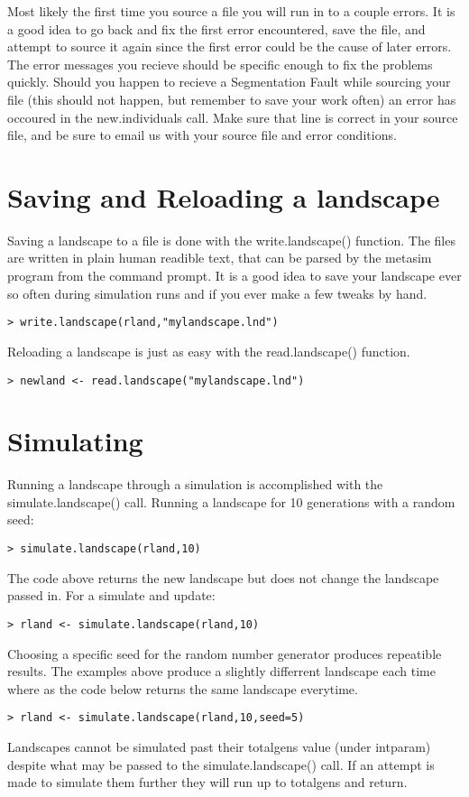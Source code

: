 \documentclass{article}
\begin{document}
Most likely the first time you source a file you will run in to a couple errors.  It is a good idea to go back and fix the first error encountered, save the file, and attempt to source it again since the first error could be the cause of later errors.  The error messages you recieve should be specific enough to fix the problems quickly.  Should you happen to recieve a Segmentation Fault while sourcing your file (this should not happen, but remember to save your work often) an error has occoured in the new.individuals call.  Make sure that line is correct in your source file, and be sure to email us with your source file and error conditions.

\section{Saving and Reloading a landscape}
Saving a landscape to a file is done with the write.landscape() function.  The files are written in plain human readible text, that can be parsed by the metasim program from the command prompt.  It is a good idea to save your landscape ever so often during simulation runs and if you ever make a few tweaks by hand.
\begin{verbatim}
> write.landscape(rland,"mylandscape.lnd")
\end{verbatim}
Reloading a landscape is just as easy with the read.landscape() function.
\begin{verbatim}
> newland <- read.landscape("mylandscape.lnd")
\end{verbatim}

\section{Simulating}
Running a landscape through a simulation is accomplished with the simulate.landscape() call.  Running a landscape for 10 generations with a random seed:
\begin{verbatim}
> simulate.landscape(rland,10)
\end{verbatim}
The code above returns the new landscape but does not change the landscape passed in.  For a simulate and update:
\begin{verbatim}
> rland <- simulate.landscape(rland,10)
\end{verbatim}
Choosing a specific seed for the random number generator produces repeatible results.  The examples above produce a  slightly differrent landscape each time where as the code below returns the same landscape everytime.
\begin{verbatim}
> rland <- simulate.landscape(rland,10,seed=5)
\end{verbatim}
Landscapes cannot be simulated past their totalgens value (under intparam) despite what may be passed to the simulate.landscape() call.  If an attempt is made to simulate them further they will run up to totalgens and return.
\end{document}
